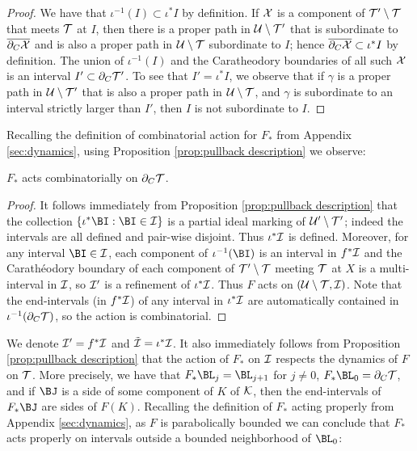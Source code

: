 \documentclass[12pt]{amsart}
\begin{document}
\begin{proof}
	We have that $\iota^{-1}(I)\subset \iota^*I$ by definition.
	If $\mathcal X$ is a component of $\mathcal T'\setminus \mathcal T$ that meets $\mathcal T$ at $I$, then there is a proper path in $\mathcal U\setminus \mathcal T'$ that is subordinate to $\overline{\partial_C \mathcal X}$ and is also a proper path in $\mathcal U\setminus \mathcal T$ subordinate to $I$; hence $\overline{\partial_C\mathcal X}\subset \iota^*I$ by definition. The union of $\iota^{-1}(I)$ and the Caratheodory boundaries of all such $\mathcal X$ is an interval $I'\subset \partial_C\mathcal T'$. To see that $I'=\iota^*I$, we observe that if $\gamma$ is a proper path in $\mathcal U\setminus \mathcal T'$ that is also a proper path in $\mathcal U\setminus \mathcal T$, and $\gamma$ is subordinate to an interval strictly larger than $I'$, then $I$ is not subordinate to $I$.
\end{proof}
Recalling the definition of combinatorial action for $F_*$ from Appendix \ref{sec:dynamics}, using Proposition \ref{prop:pullback description} we observe:
\begin{prop}\label{prop:comb action}
	$F_*$ acts combinatorially on $\partial_C \mathcal T$.
\end{prop}

\begin{proof}
	It follows immediately from Proposition \ref{prop:pullback description} that the collection $\{\iota^*\BI: \BI\in \II\}$ is a partial ideal marking of $\mathcal U'\setminus \mathcal T'$; indeed the intervals are all defined and pair-wise disjoint. Thus $\iota^*\mathcal I$ is defined. 
	Moreover, for any interval $\BI\in \II$, each component of $\iota^{-1}(\BI)$ is an interval in $f^*\mathcal I$ and the Carathéodory boundary of each component of $\mathcal T'\setminus \mathcal T$ meeting $\mathcal T$ at $X$ is a multi-interval in $\mathcal I$, so $\mathcal I'$ is a refinement of $\iota^*\mathcal I$. 
	Thus $F$ acts on $(\mathcal U\setminus \mathcal T, \mathcal I)$. 
	Note that the end-intervals (in $f^*\mathcal I$) of any interval in $\iota^*\mathcal I$ are automatically contained in $\iota^{-1}(\partial_C \mathcal T)$, so the action is combinatorial.
\end{proof}

We denote $\mathcal I' = f^*\mathcal I$ and $\tilde {\mathcal I} = \iota^*\mathcal I$. It also immediately follows from Proposition \ref{prop:pullback description} that the action of $F_*$ on $\mathcal I$ respects the dynamics of $F$ on $\mathcal T$. More precisely, we have that $F_*\BL_j= \BL_{j+1}$ for $j\neq 0$, $F_*\BL_0 = \dcara \TT$, and if $\BJ$ is a side of some component of $K$ of $\mathcal K$, then the end-intervals of  $F_*\BJ$ are sides of $F(K)$.
Recalling the definition of $F_*$ acting properly from Appendix \ref{sec:dynamics},
as $F$ is parabolically bounded we can conclude that $F_*$ acts properly on intervals outside a bounded neighborhood of $\BL_0$:
\end{document}
